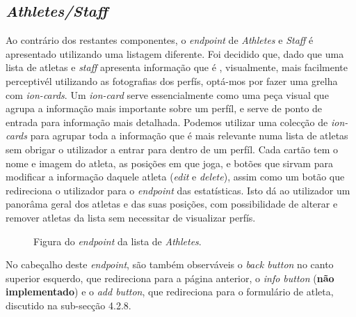 \subsection{\textit{Athletes/Staff}}\label{subsec423}

Ao contrário dos restantes componentes, o \textit{endpoint} de \textit{Athletes} e \textit{Staff} é apresentado utilizando uma listagem diferente. Foi decidido que, dado que uma lista de atletas e \textit{staff} apresenta informação que é , visualmente, mais facilmente perceptivél utilizando as fotografias dos perfís, optá-mos por fazer uma grelha com \textit{ion-cards}. Um \textit{ion-card} serve essencialmente como uma peça visual que agrupa a informação mais importante sobre um perfíl, e serve de ponto de entrada para informação mais detalhada. Podemos utilizar uma colecção de \textit{ion-cards} para agrupar toda a informação que é mais relevante numa lista de atletas sem obrigar o utilizador a entrar para dentro de um perfíl. Cada cartão tem o nome e imagem do atleta, as posições em que joga, e botões que sirvam para modificar a informação daquele atleta (\textit{edit} e \textit{delete}), assim como um botão que redireciona o utilizador para o \textit{endpoint} das estatísticas. Isto dá ao utilizador um panorâma geral dos atletas e das suas posições, com possibilidade de alterar e remover atletas da lista sem necessitar de visualizar perfís.
\newpage

\begin{figure}[h]
	\begin{center}
	\end{center}
	\caption{Figura do \textit{endpoint} da lista de \textit{Athletes}.}\label{fig:athletelist}
\end{figure}

No cabeçalho deste \textit{endpoint}, são também observáveis o \textit{back button} no canto superior esquerdo, que redireciona para a página anterior, o \textit{info button} (\textbf{não implementado}) e o \textit{add button}, que redireciona para o formulário de atleta, discutido na sub-secção 4.2.8.

